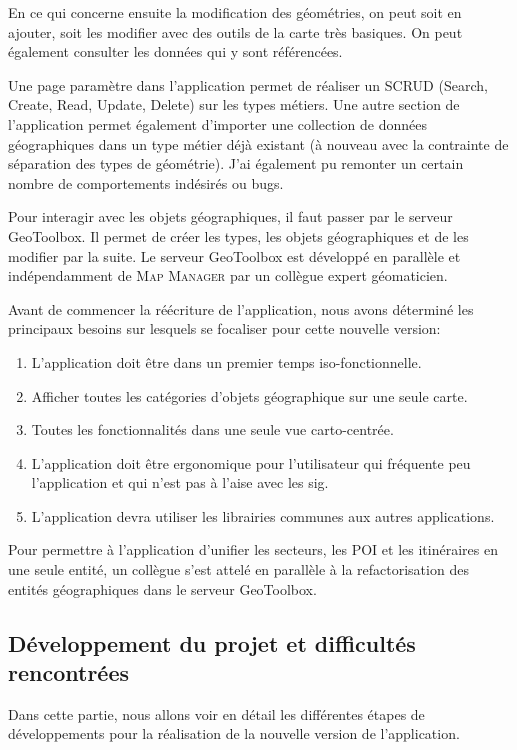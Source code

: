 \documentclass{rapportUHA40}
\begin{document}
En ce qui concerne ensuite la modification des géométries, on peut soit en
ajouter, soit les modifier avec des outils de la carte très basiques. On peut
également consulter les données qui y sont référencées.

Une page paramètre dans l'application permet de réaliser un SCRUD (Search,
Create, Read, Update, Delete) sur les types métiers. Une autre section de
l'application permet également d'importer une collection de données
géographiques dans un type métier déjà existant (à nouveau avec la contrainte
de séparation des types de géométrie). J'ai également pu remonter un certain
nombre de comportements indésirés ou bugs.

Pour interagir avec les objets géographiques, il faut passer par le serveur
GeoToolbox. Il permet de créer les types, les objets géographiques et de les
modifier par la suite. Le serveur GeoToolbox est développé en parallèle et
indépendamment de \textsc{Map Manager} par un collègue expert géomaticien.

Avant de commencer la réécriture de l'application, nous avons déterminé les
principaux besoins sur lesquels se focaliser pour cette nouvelle version:
\begin{enumerate}
  \item L'application doit être dans un premier temps iso-fonctionnelle.
  \item Afficher toutes les catégories d'objets géographique sur une seule carte.
  \item Toutes les fonctionnalités dans une seule vue carto-centrée.
  \item L'application doit être ergonomique pour l'utilisateur qui fréquente peu
        l'application et qui n'est pas à l'aise avec les \gls{sig}.
  \item L'application devra utiliser les librairies communes aux autres applications.
\end{enumerate}

Pour permettre à l'application d'unifier les secteurs, les POI et les
itinéraires en une seule entité, un collègue s'est attelé en parallèle à la
refactorisation des entités géographiques dans le serveur GeoToolbox.

\subsection{Développement du projet et difficultés rencontrées}
Dans cette partie, nous allons voir en détail les différentes étapes de
développements pour la réalisation de la nouvelle version de l'application.
\end{document}
